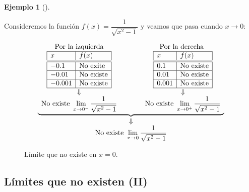 \documentclass[
  a4paper,
]{scrreport}
\theoremstyle{plain}
\theoremstyle{plain}
\theoremstyle{definition}
\theoremstyle{definition}
\newtheorem{example}{Ejemplo}[chapter]
\theoremstyle{plain}
\theoremstyle{remark}
\begin{document}
\leavevmode{}%
\begin{example}[]\label{exm-limites-no-existen}

Consideremos la función \(f(x)=\dfrac{1}{\sqrt{x^2-1}}\) y veamos que
pasa cuando \(x\to 0\):

\[
\begin{array}{c}
\underbrace{\begin{array}{ccc}
\textrm{Por la izquierda} & \qquad & \textrm{Por la derecha }\\
\begin{array}{|l|l|}
\hline
x      & f(x)   \\
\hline\hline
 -0.1   & \textrm{No exite}      \\
\hline
 -0.01   & \textrm{No existe}     \\
\hline
 -0.001  & \textrm{No existe}   \\
\hline
\end{array}
& &
\begin{array}{|l|l|}
\hline
x      & f(x)   \\
\hline\hline
 0.1    &  \textrm{No existe}      \\
\hline
 0.01   & \textrm{No existe}    \\
\hline
 0.001  & \textrm{No existe}   \\
\hline
\end{array}\\
\Downarrow & & \Downarrow\\
\displaystyle \textrm{No existe } \lim_{x\to 0^-}\frac{1}{\sqrt{x^2-1}}
& &
\displaystyle \textrm{No existe } \lim_{x\to 0^+}\frac{1}{\sqrt{x^2-1}}
\end{array}}\\
\Downarrow\\
\displaystyle \textrm{No existe }\lim_{x\to 0}\frac{1}{\sqrt{x^2-1}}
\end{array}\]

\begin{figure}

{\centering 



}

\caption{Límite que no existe en \(x=0\).}

\end{figure}

\end{example}

\hypertarget{luxedmites-que-no-existen-ii}{%
\subsection{Límites que no existen
(II)}\label{luxedmites-que-no-existen-ii}}
\end{document}
